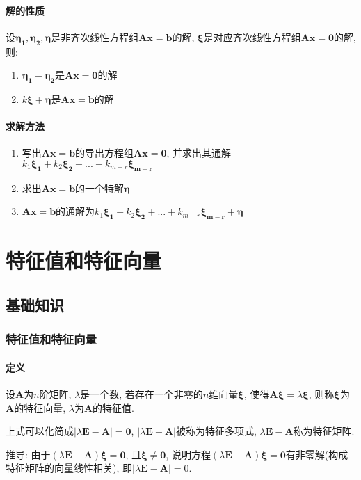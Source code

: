 \subsubsection{解的性质}
设$ \bm{\eta_{1}},\bm{\eta_{2}},\bm{\eta} $是非齐次线性方程组$ \bm{A}\bm{x}=\bm{b} $的解, $ \bm{\xi} $是对应齐次线性方程组$ \bm{A}\bm{x}=\bm{0} $的解, 则:
\begin{enumerate}
\item $ \bm{\eta_{1}}-\bm{\eta_{2}} $是$ \bm{A}\bm{x}=\bm{0} $的解
\item $ k\bm{\xi}+\bm{\eta} $是$ \bm{A}\bm{x}=\bm{b} $的解
\end{enumerate}
\subsubsection{求解方法}
\begin{enumerate}
\item 写出$ \bm{A}\bm{x}=\bm{b} $的导出方程组$ \bm{A}\bm{x}=\bm{0} $, 并求出其通解$ k_{1}\bm{\xi_{1}}+k_{2}\bm{\xi_{2}}+...+k_{m-r}\bm{\xi_{m-r}} $
\item 求出$ \bm{A}\bm{x}=\bm{b} $的一个特解$ \bm{\eta} $
\item $ \bm{A}\bm{x}=\bm{b} $的通解为$ k_{1}\bm{\xi_{1}}+k_{2}\bm{\xi_{2}}+...+k_{m-r}\bm{\xi_{m-r}}+\bm{\eta} $
\end{enumerate}
\chapter{特征值和特征向量}
\section{基础知识}
\subsection{特征值和特征向量}
\subsubsection{定义}
设$ \bm{A} $为$ n $阶矩阵, $ \lambda $是一个数, 若存在一个非零的$ n $维向量$ \bm{\xi} $, 使得$ \bm{A}\bm{\xi}=\lambda \bm{\xi} $, 则称$ \bm{\xi} $为$ \bm{A} $的特征向量, $ \lambda $为$ \bm{A} $的特征值.
\par 上式可以化简成$ \left| \lambda \bm{E}-\bm{A}\right|=\bm{0} $, $ \left| \lambda \bm{E}-\bm{A}\right| $被称为特征多项式, $ \lambda \bm{E}-\bm{A} $称为特征矩阵. \par
推导: 由于$ (\lambda \bm{E} - \bm{A}) \bm{\xi} = \bm{0} $, 且$ \bm{\xi} \neq \bm{0} $, 说明方程$ (\lambda \bm{E} - \bm{A}) \bm{\xi} = \bm{0} $有非零解(构成特征矩阵的向量线性相关), 即$ |\lambda \bm{E} - \bm{A}| = 0 $.
